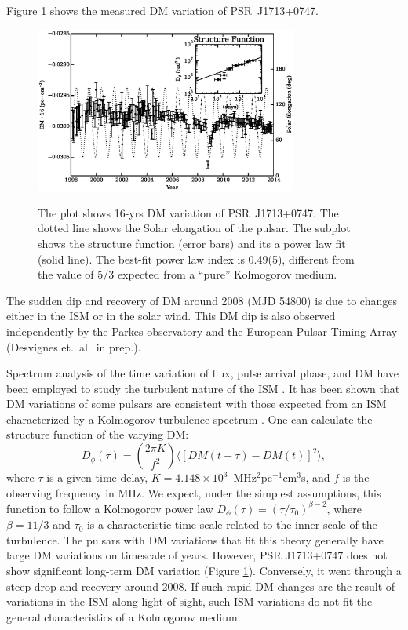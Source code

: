 Figure \ref{fig:dmx} shows the measured DM variation of PSR~J1713+0747.
%
\begin{figure}
\includegraphics[width=3.4in]{DMX.ps} \\ 
\caption {\label{fig:dmx} The plot shows 16-yrs DM variation of PSR~J1713+0747. The dotted line shows the Solar
elongation of the pulsar. The subplot shows the structure
function (error bars) and its a power law fit (solid line). The best-fit power law index is
0.49(5), different from the value of $5/3$ expected from a ``pure'' Kolmogorov medium. } 
\end{figure} 
The sudden dip and recovery of DM around 2008 (MJD 54800) is 
due to changes either in the ISM or in the solar wind. This DM dip is also
observed independently by the Parkes observatory \citep{kcs+13} and the
European Pulsar Timing Array (Desvignes et.~al.\ in prep.).



Spectrum analysis of the time variation of flux, pulse arrival phase, and DM have 
been employed to study the turbulent nature of the ISM \citep[e.g.][]{cpl86, rl90}.
It has been shown that DM variations of some pulsars are consistent with
those expected from an ISM characterized by a Kolmogorov turbulence spectrum
\citep{cwd+90, ric90, ktr94, yhc+07, kcs+13, fst14}. One can calculate the 
structure function of the varying DM: 
\begin{equation}
D_{\phi}(\tau)=\left(\frac{2\pi K}{f^2}\right)\langle [DM(t+\tau)-DM(t)]^2\rangle, 
\end{equation}
where $\tau$ 
is a given time delay, $K=4.148\times10^3$~MHz$^2$pc$^{-1}$cm$^3$s, and $f$ is 
the observing frequency in MHz. We expect, under the simplest assumptions, 
this function to follow a Kolmogorov power law $D_{\phi}(\tau)=(\tau/\tau_0)^{\beta -2}$, 
where $\beta=11/3$ and $\tau_0$ is a characteristic time scale related to 
the inner scale of the turbulence. The pulsars with DM variations that fit this
theory generally have large DM variations on timescale of 
years. However, PSR J1713+0747 does not show significant long-term DM variation 
(Figure \ref{fig:dmx}). Conversely, it went through a steep drop and recovery 
around 2008. If such rapid DM changes are the result of variations in the ISM along
light of sight, such ISM variations do not fit the general characteristics of
a Kolmogorov medium. 

